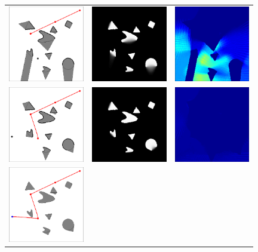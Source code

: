 \begin{figure}
\begin{tabular}{ccc}
\includegraphics[width=1.3in]{2D/scene_03}&
\includegraphics[width=1.3in]{2D/marginal_03}&
\includegraphics[width=1.3in]{2D/energy_03}\\
\includegraphics[width=1.3in]{2D/scene_04}&
\includegraphics[width=1.3in]{2D/marginal_04}&
\includegraphics[width=1.3in]{2D/energy_04}\\
\includegraphics[width=1.3in]{2D/scene_05}&

\end{tabular}
\end{figure}
